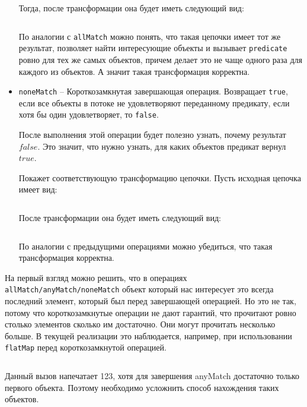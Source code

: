 \begin{itemize}
	Тогда, после трансформации она будет иметь следующий вид:
	
	\inputminted{java}{chapter2/code/anyMatchTransform.java}
	
	По аналогии с \texttt{allMatch} можно понять, что такая цепочки имеет тот же результат, позволяет найти интересующие объекты и вызывает \texttt{predicate} ровно для тех же самых объектов, причем делает это не чаще одного раза для каждого из объектов. А значит такая трансформация корректна.
	\item \texttt{noneMatch} -- Короткозамкнутая завершающая операция. Возвращает \texttt{true}, если все объекты в потоке не удовлетворяют переданному предикату, если хотя бы один удовлетворяет, то \texttt{false}.
	
	После выполнения этой операции будет полезно узнать, почему результат $false$. Это значит, что нужно узнать, для каких объектов предикат вернул $true$. 
	
	Покажет соответствующую трансформацию цепочки. Пусть исходная цепочка имеет вид:
	\inputminted{java}{chapter2/code/anyMatch.java}
	
	После трансформации она будет иметь следующий вид:
	
	\inputminted{java}{chapter2/code/anyMatchTransform.java}
	
	По аналогии с предыдущими операциями можно убедиться, что такая трансформация корректна.
\end{itemize}

На первый взгляд можно решить, что в операциях \texttt{allMatch/anyMatch/noneMatch} объект который нас интересует это всегда последний элемент, который был перед завершающей операцией. Но это не так, потому что короткозамкнутые операции не дают гарантий, что прочитают ровно столько элементов сколько им достаточно. Они могут прочитать несколько больше. В текущей реализации это наблюдается, например, при использовании \texttt{flatMap} перед короткозамкнутой операцией. 
\inputminted{java}{chapter2/code/flatMapBeforeAnyMatch.java}
Данный вызов напечатает 123, хотя для завершения anyMatch достаточно только первого объекта. Поэтому необходимо усложнить способ нахождения таких объектов.

